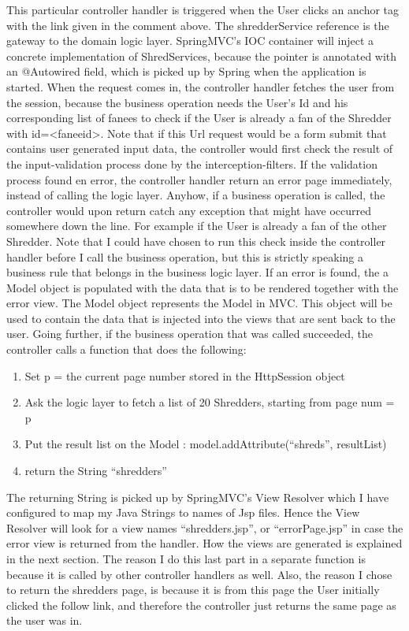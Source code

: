 This particular controller handler is triggered when the User clicks an anchor tag with the link given in the comment above. The shredderService reference is the gateway to the domain logic layer. SpringMVC's IOC container will inject a concrete implementation of ShredServices, because the pointer is annotated with an @Autowired field, which is picked up by Spring when the application is started. When the request comes in, the controller handler fetches the user from the session, because the business operation needs the User's Id and his corresponding list of fanees to check if the User is already a fan of the Shredder with id=<faneeid>. Note that if this Url request would be a form submit that contains user generated input data, the controller would first check the result of the input-validation process done by the interception-filters. If the validation process found en error, the controller handler return an error page immediately, instead of calling the logic layer. Anyhow, if a business operation is called, the controller would upon return catch any exception that might have occurred somewhere down the line. For example if the User is already a fan of the other Shredder. Note that I could have chosen to run this check inside the controller handler before I call the business operation, but this is strictly speaking a business rule that belongs in the business logic layer. If an error is found, the a Model object is populated with the data that is to be rendered together with the error view. The Model object represents the Model in MVC. This object will be used to contain the data that is injected into the views that are sent back to the user. Going further, if the business operation that was called succeeded, the controller calls a function that does the following:
\begin{enumerate}
\item{} Set p = the current page number stored in the HttpSession object
\item{} Ask the logic layer to fetch a list of 20 Shredders, starting from page num = p
\item{} Put the result list on the Model : model.addAttribute(``shreds'', resultList)
\item{} return the String ``shredders''
\end{enumerate}
The returning String is picked up by SpringMVC's View Resolver which I have configured to map my Java Strings to names of Jsp files. Hence the View Resolver will look for a view names ``shredders.jsp'', or ``errorPage.jsp'' in case the error view is returned from the handler. How the views are generated is explained in the next section. The reason I do this last part in a separate function is because it is called by other controller handlers as well. Also, the reason I chose to return the shredders page, is because it is from this page the User initially clicked the follow link, and therefore the controller just returns the same page as the user was in.
 
